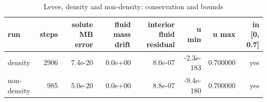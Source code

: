 \begin{table}[h]
\centering
\caption{Levee, density and non-density: conservation and bounds}
\begin{tabular}{lrrrrrrr}
\hline
run & steps & solute MB error & fluid mass drift & interior fluid residual & u min & u max & in [0, 0.7] \\
\hline
density & 2906 & 7.4e-20 & 0.0e+00 & 8.0e-07 & -2.3e-183 & 0.700000 & yes \\
non-density & 985 & 5.0e-20 & 0.0e+00 & 8.8e-07 & -9.4e-180 & 0.700000 & yes \\
\hline
\end{tabular}
\end{table}
